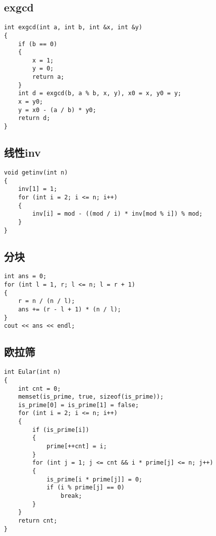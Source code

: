 \documentclass[]{article}
\begin{document}
\hypertarget{exgcd}{%
\subsection{exgcd}\label{exgcd}}

\begin{verbatim}
int exgcd(int a, int b, int &x, int &y)
{
    if (b == 0)
    {
        x = 1;
        y = 0;
        return a;
    }
    int d = exgcd(b, a % b, x, y), x0 = x, y0 = y;
    x = y0;
    y = x0 - (a / b) * y0;
    return d;
}
\end{verbatim}

\hypertarget{ux7ebfux6027inv}{%
\subsection{线性inv}\label{ux7ebfux6027inv}}

\begin{verbatim}
void getinv(int n)
{
    inv[1] = 1;
    for (int i = 2; i <= n; i++)
    {
        inv[i] = mod - ((mod / i) * inv[mod % i]) % mod;
    }
}
\end{verbatim}

\hypertarget{ux5206ux5757}{%
\subsection{分块}\label{ux5206ux5757}}

\begin{verbatim}
int ans = 0;
for (int l = 1, r; l <= n; l = r + 1)
{
    r = n / (n / l);
    ans += (r - l + 1) * (n / l);
}
cout << ans << endl;
\end{verbatim}

\hypertarget{ux6b27ux62c9ux7b5b}{%
\subsection{欧拉筛}\label{ux6b27ux62c9ux7b5b}}

\begin{verbatim}
int Eular(int n)
{
    int cnt = 0;
    memset(is_prime, true, sizeof(is_prime));
    is_prime[0] = is_prime[1] = false;
    for (int i = 2; i <= n; i++)
    {
        if (is_prime[i])
        {
            prime[++cnt] = i;
        }
        for (int j = 1; j <= cnt && i * prime[j] <= n; j++)
        {
            is_prime[i * prime[j]] = 0;
            if (i % prime[j] == 0)
                break;
        }
    }
    return cnt;
}
\end{verbatim}
\end{document}
